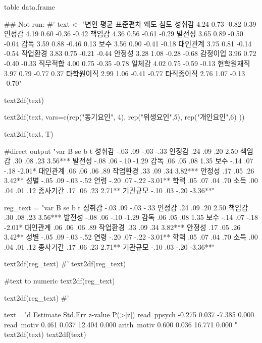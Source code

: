 \documentclass[a4paper]{book}
\begin{document}
%
\begin{Value}
table data.frame
\end{Value}
%
\begin{Examples}
\begin{ExampleCode}

## Not run: 
#'
text <- "변인 평균 표준편차 왜도 첨도
성취감 4.24 0.73 -0.82 0.39
인정감 4.19 0.60 -0.36 -0.42
책임감 4.36 0.56 -0.61 -0.29
발전성 3.65 0.89 -0.50 -0.04
감독 3.59 0.88 -0.46 0.13
보수 3.56 0.90 -0.41 -0.18
대인관계 3.75 0.81 -0.14 -0.54
작업환경 3.83 0.75 -0.21 -0.44
안정성 3.28 1.08 -0.28 -0.68
감정이입 3.96 0.72 -0.40 -0.33
직무적합 4.00 0.75 -0.35 -0.78
일체감 4.02 0.75 -0.59 -0.13
현학원재직 3.97 0.79 -0.77 0.37
타학원이직 2.99 1.06 -0.41 -0.77
타직종이직 2.76 1.07 -0.13 -0.70"

text2df(text)

text2df(text, vars=c(rep("동기요인", 4), rep("위생요인",5), rep("개인요인",6)  ))

text2df(text, T)%

#direct output
"var B se b t
성취감 -.03 .09 -.03 -.33
인정감 .24 .09 .20 2.50
책임감 .30 .08 .23 3.56***
발전성 -.08 .06 -.10 -1.29
감독 .06 .05 .08 1.35
보수 -.14 .07 -.18 -2.01*
대인관계 .06 .06 .06 .89
작업환경 .33 .09 .34 3.82***
안정성 .17 .05 .26 3.42**
성별 -.05 .09 -.03 -.52
연령 -.20 .07 -.22 -3.01**
학력 .05 .07 .04 .70
소득 .00 .04 .01 .12
종사기간 .17 .06 .23 2.71**
기관규모 -.10 .03 -.20 -3.36**" %

reg_text = "var B se b t
성취감 -.03 .09 -.03 -.33
인정감 .24 .09 .20 2.50
책임감 .30 .08 .23 3.56***
발전성 -.08 .06 -.10 -1.29
감독 .06 .05 .08 1.35
보수 -.14 .07 -.18 -2.01*
대인관계 .06 .06 .06 .89
작업환경 .33 .09 .34 3.82***
안정성 .17 .05 .26 3.42**
성별 -.05 .09 -.03 -.52
연령 -.20 .07 -.22 -3.01**
학력 .05 .07 .04 .70
소득 .00 .04 .01 .12
종사기간 .17 .06 .23 2.71**
기관규모 -.10 .03 -.20 -3.36**"

text2df(reg_text)
#'
text2df(reg_text) %

#text to numeric
text2df(reg_text)%

text2df(reg_text)%
#'

text ="d           Estimate  Std.Err  z-value  P(>|z|)
  read~ppsych           -0.275    0.037   -7.385    0.000
    read~motiv             0.461    0.037   12.404    0.000
arith~motiv             0.600    0.036   16.771    0.000
"
text2df(text)
text2df(text) %


\end{ExampleCode}
\end{Examples}
\end{document}
